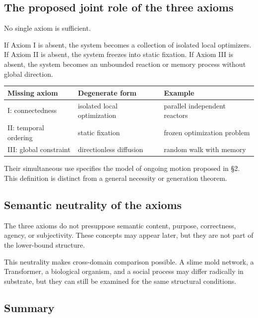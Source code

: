 \subsection{The proposed joint role of the three axioms}

No single axiom is sufficient.

If Axiom I is absent, the system becomes a collection of isolated local optimizers. If Axiom II is absent, the system freezes into static fixation. If Axiom III is absent, the system becomes an unbounded reaction or memory process without global direction.

\begin{table}[H]
\centering
\small
\begin{tabularx}{\textwidth}{>{\raggedright\arraybackslash}X>{\raggedright\arraybackslash}X>{\raggedright\arraybackslash}X}
\toprule
Missing axiom & Degenerate form & Example \\
\midrule
I: connectedness & isolated local optimization & parallel independent reactors \\
II: temporal ordering & static fixation & frozen optimization problem \\
III: global constraint & directionless diffusion & random walk with memory \\
\bottomrule
\end{tabularx}
\end{table}

Their simultaneous use specifies the model of ongoing motion proposed in \S{}2. This definition is distinct from a general necessity or generation theorem.

\subsection{Semantic neutrality of the axioms}

The three axioms do not presuppose semantic content, purpose, correctness, agency, or subjectivity. These concepts may appear later, but they are not part of the lower-bound structure.

This neutrality makes cross-domain comparison possible. A slime mold network, a Transformer, a biological organism, and a social process may differ radically in substrate, but they can still be examined for the same structural conditions.

\subsection{Summary}

